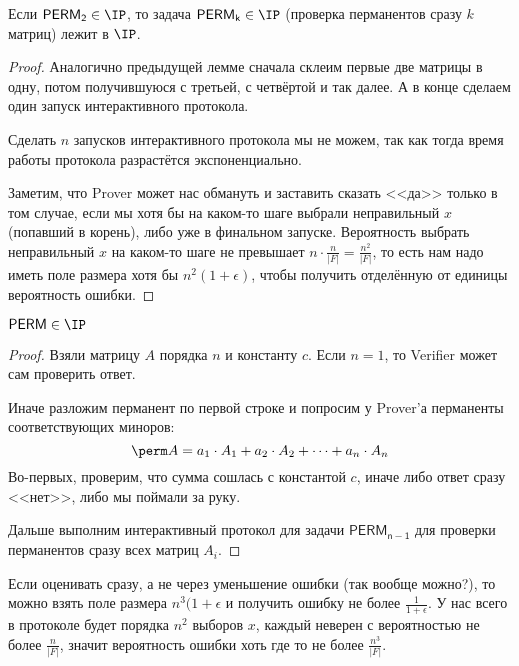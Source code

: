 	\begin{lemma}
		Если $\mathsf{PERM_2} \in \IP$, то
		задача $\mathsf{PERM_k} \in \IP$ (проверка перманентов сразу $k$ матриц) лежит в $\IP$.
	\end{lemma}
	\begin{proof}
		Аналогично предыдущей лемме сначала склеим первые две матрицы в одну, потом получившуюся с третьей, с четвёртой и так далее.
		А в конце сделаем один запуск интерактивного протокола.
		\begin{Rem}
			Сделать $n$ запусков интерактивного протокола мы не можем, так как тогда время работы протокола разрастётся экспоненциально.
		\end{Rem}

		Заметим, что Prover может нас обмануть и заставить сказать <<да>> только в том случае, если мы хотя бы на каком-то шаге выбрали неправильный $x$ (попавший в корень), либо уже
		в финальном запуске.
		Вероятность выбрать неправильный $x$ на каком-то шаге не превышает $n\cdot\frac{n}{|F|} = \frac{n^2}{|F|}$, то есть нам надо иметь поле размера хотя бы $n^2(1+\epsilon)$, чтобы получить отделённую от единицы вероятность ошибки.
	\end{proof}

	\begin{theorem}
		$\mathsf{PERM} \in \IP$
	\end{theorem}
	\begin{proof}
		Взяли матрицу $A$ порядка $n$ и константу $c$.
		Если $n=1$, то Verifier может сам проверить ответ.

		Иначе разложим перманент по первой строке и попросим у Prover'а перманенты соответствующих миноров:
		\[
			\perm A = a_1 \cdot A_1 + a_2 \cdot A_2 + \dots + a_n \cdot A_n
		\]
		Во-первых, проверим, что сумма сошлась с константой $c$, иначе либо ответ сразу <<нет>>, либо мы поймали за руку.

		Дальше выполним интерактивный протокол для задачи $\mathsf{PERM_{n-1}}$ для проверки перманентов сразу всех матриц $A_i$.
	\end{proof}

	\begin{Rem}
		Если оценивать сразу, а не через уменьшение ошибки (так вообще можно?), то можно взять поле размера $n^3(1+\epsilon$ и получить ошибку не более $\frac{1}{1+\epsilon}$.
		У нас всего в протоколе будет порядка $n^2$ выборов $x$, каждый неверен с вероятностью не более $\frac{n}{|F|}$, значит вероятность ошибки хоть где то не более $\frac{n^3}{|F|}$.
	\end{Rem}
